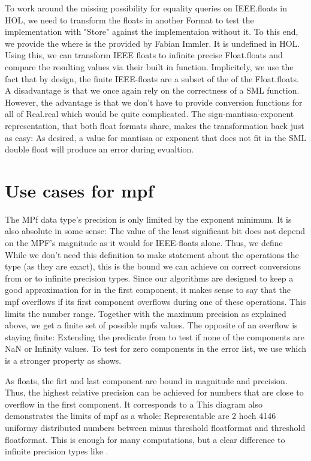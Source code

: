 \documentclass[11pt,a4paper]{article}
\begin{document}
To work around the missing possibility for equality queries on IEEE.floats in HOL, we need to transform the floats in another Format to test the implementation with "Store" against the implementaion without it. To this end, we provide the
where
is the
provided by Fabian Immler. It is undefined in HOL. Using this, we can transform IEEE floats to infinite precise Float.floats and compare the resulting values via their built in
function. Implicitely, we use the fact that by design, the finite IEEE-floats are a subset of the of the Float.floats. A disadvantage is that we once again rely on the correctness of a SML function. However, the advantage is that we don't have to provide conversion functions for all of Real.real which would be quite complicated. The sign-mantissa-exponent representation, that both float formats share, makes the transformation back just as easy:
As desired, a value for mantissa or exponent that does not fit in the SML double float will produce an error during evualtion.

\section{Use cases for mpf}
The MPf data type's precision is only limited by the exponent minimum. It is also absolute in some sense: The value of the least significant bit
does not depend on the MPF's magnitude as it would for IEEE-floats alone.
Thus, we define
While we don't need this definition to make statement about the operations
the \typmpf type (as they are exact), this is the bound we can achieve on correct conversions from or to infinite precision types.
Since our algorithms are designed to keep a good approximation for
in the first component, it makes sense to say that the mpf overflows if its first component overflows during one of these operations. This limits the number range. Together with the maximum precision as explained above, we get a finite set of possible mpfs values.
The opposite of an overflow is staying finite: Extending the
predicate from
to test if none of the components are NaN or Infinity values. To test for zero components in the error list, we use
which is a stronger property as
shows.


As floats, the firt and last component are bound in magnitude and precision. Thus, the highest relative precision can be achieved for numbers that are close to overflow in the first component. It corresponds to a 
This diagram also demonstrates the limits of mpf as a whole: Representable are 2 hoch 4146 uniformy distributed numbers between minus threshold floatformat and threshold floatformat. This is enough for many computations, but a clear difference to infinite precision types like
.
\end{document}
